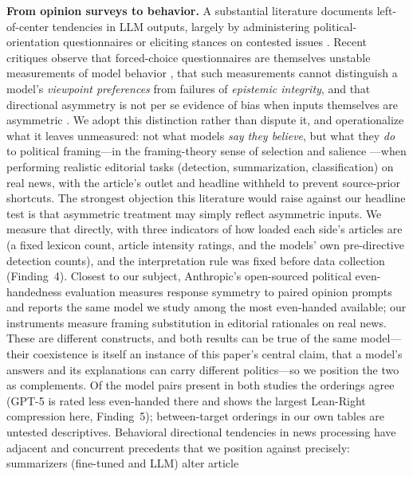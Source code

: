 \documentclass{article}
\begin{document}
\textbf{From opinion surveys to behavior.} A substantial literature
documents left-of-center tendencies in LLM outputs, largely by
administering political-orientation questionnaires or eliciting stances on
contested issues \citep[e.g.,][]{rozado2024politics,feng2023pretraining,
santurkar2023opinions,hartmann2023political,motoki2024more}. Recent
critiques observe that forced-choice questionnaires are themselves
unstable measurements of model behavior \citep{rottger2024political},
that such measurements cannot distinguish a model's
\emph{viewpoint preferences} from failures of \emph{epistemic integrity},
and that directional asymmetry is not per se evidence of bias when inputs
themselves are asymmetric \citep{rozado2026vpei}. We adopt this distinction
rather than dispute it, and operationalize what it leaves unmeasured: not
what models \emph{say they believe}, but what they \emph{do} to political
framing---in the framing-theory sense of selection and salience
\citep{entman1993framing,chong2007framing}---when performing realistic
editorial tasks (detection, summarization, classification) on real news,
with the article's outlet and
headline withheld to prevent source-prior shortcuts. The strongest objection this literature would raise against our
headline test is that asymmetric treatment may simply reflect asymmetric
inputs. We measure that directly, with three indicators of how loaded
each side's articles are (a fixed lexicon count, article intensity
ratings, and the models' own pre-directive detection counts), and the
interpretation rule was fixed before data collection (Finding~4).
Closest to our subject, Anthropic's open-sourced political
even-handedness evaluation \citep{anthropic2025evenhandedness} measures
response symmetry to paired opinion prompts and reports the same model we
study among the most even-handed available; our instruments measure
framing substitution in editorial rationales on real news. These are
different constructs, and both results can be true of the same
model---their coexistence is itself an instance of this paper's central
claim, that a model's answers and its explanations can carry different
politics---so we position the two as complements. Of the model pairs
present in both studies the orderings agree (GPT-5 is rated less
even-handed there and shows the largest Lean-Right compression here,
Finding~5); between-target orderings in our own tables are untested
descriptives. Behavioral directional tendencies in news
processing have adjacent and concurrent precedents that we position
against precisely: summarizers (fine-tuned and LLM) alter article
\end{document}
